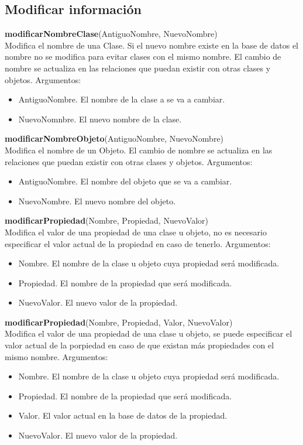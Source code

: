 \documentclass[11pt]{article}
\newcommand{\comando}[2]{
    \textbf{#1}(#2)\\
}
\newenvironment{args}{
    \newline
    Argumentos:
    \begin{itemize}
}{
    \end{itemize}
    \bigskip
}
\begin{document}
\subsection{Modificar información}

\comando{modificarNombreClase}{AntiguoNombre, NuevoNombre}
Modifica el nombre de una Clase. Si el nuevo nombre existe en la base de datos el nombre no se modifica para evitar clases con el mismo nombre. El cambio de nombre se actualiza en las relaciones que puedan existir con otras clases y objetos.
\begin{args}
\item AntiguoNombre. El nombre de la clase a se va a cambiar.
\item NuevoNomnbre. El nuevo nombre de la clase.
\end{args}

\comando{modificarNombreObjeto}{AntiguoNombre, NuevoNombre}
Modifica el nombre de un Objeto. El cambio de nombre se actualiza en las relaciones que puedan existir con otras clases y objetos.
\begin{args}
\item AntiguoNombre. El nombre del objeto que se va a cambiar.
\item NuevoNombre. El nuevo nombre del objeto.
\end{args}

\comando{modificarPropiedad}{Nombre, Propiedad, NuevoValor}
Modifica el valor de una propiedad de una clase u objeto, no es necesario especificar el valor actual  de la propiedad en caso de tenerlo.
\begin{args}
\item Nombre. El nombre de la clase u objeto cuya propiedad será modificada.
\item Propiedad. El nombre de la propiedad que será modificada.
\item NuevoValor. El nuevo valor de la propiedad.
\end{args}

\comando{modificarPropiedad}{Nombre, Propiedad, Valor, NuevoValor}
Modifica el valor de una propiedad de una clase u objeto, se puede especificar el valor actual de la porpiedad en caso de que existan más propiedades con el mismo nombre.
\begin{args}
\item Nombre. El nombre de la clase u objeto cuya propiedad será modificada.
\item Propiedad. El nombre de la propiedad que será modificada.
\item Valor. El valor actual en la base de datos de la propiedad.
\item NuevoValor. El nuevo valor de la propiedad.
\end{args}
\end{document}
